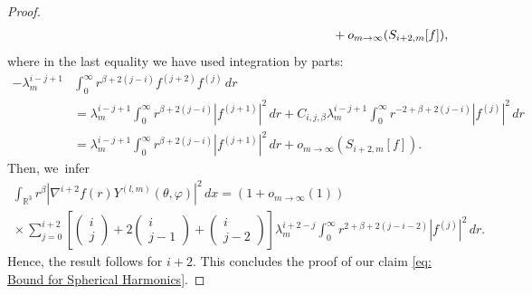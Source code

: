 \documentclass[10pt]{amsart}
\theoremstyle{plain}
\theoremstyle{definition}
\begin{document}
\begin{proof}
\[\begin{aligned}
&\hspace*{9cm}+o_{m\to\infty}(S_{i+2,m}[f]),
\end{aligned}
\]
where in the last equality we have used integration by parts:
\[
\begin{aligned}
-\lambda_m^{i-j+1}&\int_0^\infty r^{\beta+2(j-i)}f^{(j+2)} f^{(j)}\,dr\\
&=\lambda_m^{i-j+1}\int_0^\infty r^{\beta+2(j-i)}|f^{(j+1)}|^2\,dr+C_{i,j,\beta}\lambda_m^{i-j+1}\int_0^\infty r^{-2+\beta+2(j-i)}|f^{(j)}|^2\,dr\\
&=\lambda_m^{i-j+1}\int_0^\infty r^{\beta+2(j-i)}|f^{(j+1)}|^2\,dr+o_{m\to\infty}(S_{i+2,m}[f]).
\end{aligned}
\]
Then, we~infer
\begin{multline*}
\int_{\mathbb R^3} r^\beta|\nabla^{i+2} f(r)Y^{(l,m)}(\theta,\varphi)|^2\,dx=(1+o_{m\to\infty}(1)) \\
{}\times\sum_{j=0}^{i+2} \left[\begin{pmatrix} i\\ j\end{pmatrix} +2\begin{pmatrix} i\\ j-1\end{pmatrix}+\begin{pmatrix} i\\ j-2\end{pmatrix} \right]\lambda_m^{i+2-j}\int_0^\infty r^{2+\beta+2(j-i-2)}|f^{(j)}|^2\,dr.
\end{multline*}
Hence, the result follows for $i+2$. This concludes the proof of our claim \eqref{eq: Bound for Spherical Harmonics}.


\end{proof}
\end{document}
